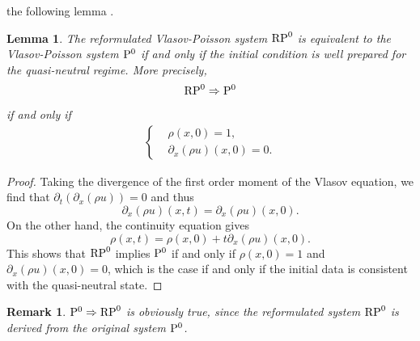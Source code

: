 \documentclass[letterpaper,10pt]{article}
\newtheorem{lemma}{Lemma}[section]
\newtheorem{remark}{Remark}[section]
\numberwithin{equation}{section}
\numberwithin{figure}{section}
\numberwithin{table}{section}
\begin{document}
the following lemma \cite{Crou2016}.
\begin{lemma}
The reformulated Vlasov-Poisson system ${\rm RP}^0$ is equivalent to the Vlasov-Poisson system ${\rm P}^0$ if and only if the initial condition is well prepared for the quasi-neutral regime. More precisely,
$$
    {\rm RP}^0 \Rightarrow {\rm P}^0
$$
if and only if 
\begin{align*}
    \left\{
        \begin{aligned}
            &\rho(x,0)=1,\\
            &\partial_x(\rho u)(x,0)=0.
        \end{aligned}
    \right.
\end{align*}
\end{lemma}
\begin{proof}
  Taking the divergence of the first order moment of the Vlasov equation, we find that $\partial_t(\partial_x (\rho u))=0$ and thus
  $$
    \partial_x(\rho u)(x,t)=\partial_x(\rho u)(x,0).
  $$
  On the other hand, the continuity equation gives 
  $$
    \rho(x,t)=\rho(x,0)+t\partial_x(\rho u)(x,0).
  $$
  This shows that ${\rm RP}^0$ implies ${\rm P}^0$ if and only if $\rho(x,0)=1$ and $\partial_x(\rho u)(x,0)=0$, which is the case if and only if the initial data is consistent with the quasi-neutral
  state.
\end{proof}
\begin{remark}
  ${\rm P}^0 \Rightarrow {\rm RP}^0$ is obviously true, since the reformulated system ${\rm RP}^0$ is derived from the original system ${\rm P}^0$.
\end{remark}




\end{document}
